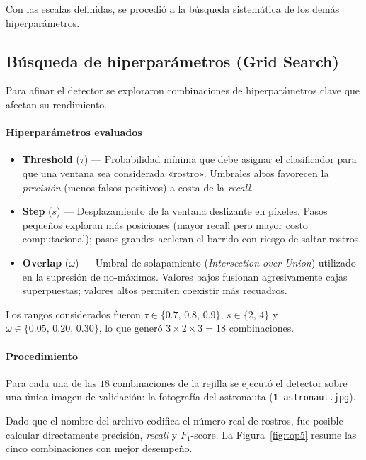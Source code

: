 \documentclass{article}
\begin{document}
Con las escalas definidas, se procedió a la búsqueda sistemática de los demás
hiperparámetros.


\subsection*{Búsqueda de hiperparámetros (Grid Search)}
Para afinar el detector se exploraron combinaciones de hiperparámetros clave que afectan su rendimiento. 

\paragraph{Hiperparámetros evaluados}
\begin{itemize}
    \item \textbf{Threshold} (\(\tau\)) — Probabilidad mínima que debe asignar el
          clasificador para que una ventana sea considerada «rostro».
          Umbrales altos favorecen la \emph{precisión} (menos falsos positivos)
          a costa de la \emph{recall}.
    \item \textbf{Step} (\(s\)) — Desplazamiento de la ventana deslizante en
          píxeles.  
          Pasos pequeños exploran más posiciones (mayor recall pero mayor costo
          computacional); pasos grandes aceleran el barrido con riesgo de saltar
          rostros.
    \item \textbf{Overlap} (\(\omega\)) — Umbral de solapamiento
          (\emph{Intersection over Union}) utilizado en la supresión de
          no-máximos. Valores bajos fusionan agresivamente cajas
          superpuestas; valores altos permiten coexistir más recuadros.
\end{itemize}

Los rangos considerados fueron
\(\tau \in \{0.7,\,0.8,\,0.9\}\),
\(s \in \{2,\,4\}\) y
\(\omega \in \{0.05,\,0.20,\,0.30\}\),
lo que generó \(3\times2\times3 = 18\) combinaciones.

\paragraph{Procedimiento}
Para cada una de las \(18\) combinaciones de la rejilla se ejecutó el detector sobre una única imagen de validación: la fotografía del astronauta (\verb|1-astronaut.jpg|).  

Dado que el nombre del archivo codifica el número real de rostros, fue posible
calcular directamente precisión, \emph{recall} y $F_1$-score.  
La Figura~\ref{fig:top5} resume las cinco combinaciones con mejor desempeño.
\end{document}
